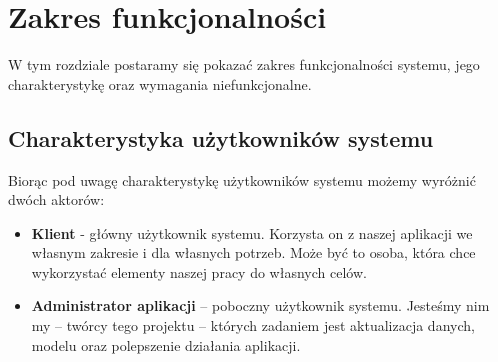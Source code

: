 %
%
%
%




\chapter{Zakres funkcjonalności}
\label{cha:2}

W tym rozdziale postaramy się pokazać zakres funkcjonalności systemu, jego charakterystykę oraz wymagania niefunkcjonalne.

\section{Charakterystyka użytkowników systemu}
\label{sec:2.1}

Biorąc pod uwagę charakterystykę użytkowników systemu możemy wyróżnić dwóch aktorów:
\begin{itemize}[label=\textbullet]
\item \textbf{Klient} - główny użytkownik systemu. Korzysta on z naszej aplikacji we własnym zakresie i dla własnych potrzeb. Może być to osoba, która chce wykorzystać elementy naszej pracy do własnych celów.
\item \textbf{Administrator aplikacji} – poboczny użytkownik systemu. Jesteśmy nim my – twórcy tego projektu – których zadaniem jest aktualizacja danych, modelu oraz polepszenie działania aplikacji.
\end{itemize}

